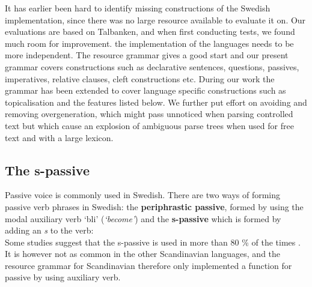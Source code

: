 \documentclass[10pt, a4paper]{article}
\begin{document}
It has earlier been hard to identify missing constructions of the Swedish
implementation, since there was no large resource available to evaluate it on.
Our evaluations are based on Talbanken, and when first conducting tests,
we found much room for improvement.
the implementation of the languages needs to be more independent.
The resource grammar gives a good start and our present grammar 
covers constructions such as declarative sentences, questions, passives,
imperatives, relative clauses, cleft constructions etc.
During our work the grammar has been extended to cover language specific
constructions such as topicalisation and the features listed below. We further
put effort on avoiding and removing overgeneration, which might pass unnoticed
when parsing controlled text but which cause an explosion of ambiguous parse trees
when used for free text and with a large lexicon.
\subsection{The s-passive}
Passive voice is commonly used in Swedish.
There are two ways of forming passive verb phrases in Swedish: the 
\textbf{periphrastic passive}, formed by using the modal auxiliary verb `bli'
(\emph{`become'}) and the \textbf{s-passive} which is formed by adding an
\emph{s} to the verb: \\
\label{sent:skrevs}
Some studies suggest that the s-passive is used in more than 80 \% of the times
\cite{laanemets}.
It is however not as common in the other Scandinavian languages,
and the resource grammar for Scandinavian therefore only implemented a function for
passive by using auxiliary verb.
\end{document}
